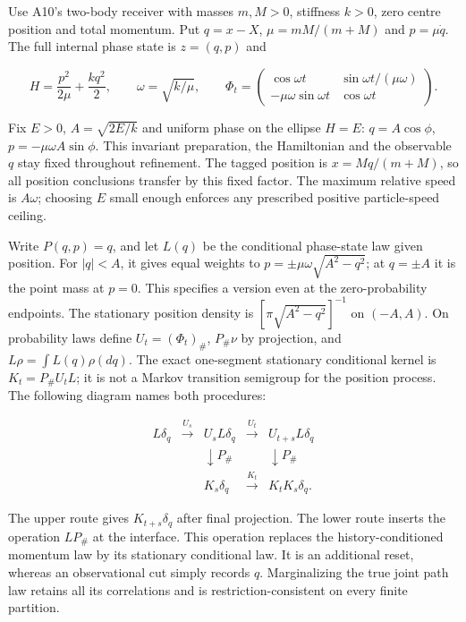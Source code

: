 \documentclass[11pt,a4paper]{article}
\begin{document}
Use A10's two-body receiver with masses \(m,M>0\), stiffness \(k>0\),
zero centre position and total momentum. Put \(q=x-X\), \(\mu=mM/(m+M)\)
and \(p=\mu\dot q\). The full internal phase state is \(z=(q,p)\) and

\[H=\frac{p^2}{2\mu}+\frac{kq^2}{2},\qquad
\omega=\sqrt{k/\mu},\qquad
\Phi_t=\begin{pmatrix}
\cos\omega t&\sin\omega t/(\mu\omega)\\
-\mu\omega\sin\omega t&\cos\omega t
\end{pmatrix}.
\]

Fix \(E>0\), \(A=\sqrt{2E/k}\) and uniform phase on the ellipse \(H=E\):
\(q=A\cos\phi\), \(p=-\mu\omega A\sin\phi\). This invariant preparation,
the Hamiltonian and the observable \(q\) stay fixed throughout
refinement. The tagged position is \(x=Mq/(m+M)\), so all position
conclusions transfer by this fixed factor. The maximum relative speed is
\(A\omega\); choosing \(E\) small enough enforces any prescribed
positive particle-speed ceiling.

Write \(P(q,p)=q\), and let \(L(q)\) be the conditional phase-state law
given position. For \(|q|<A\), it gives equal weights to
\(p=\pm\mu\omega\sqrt{A^2-q^2}\); at \(q=\pm A\) it is the point mass at
\(p=0\). This specifies a version even at the zero-probability
endpoints. The stationary position density is
\([\pi\sqrt{A^2-q^2}]^{-1}\) on \((-A,A)\). On probability laws define
\(U_t=(\Phi_t)_\#\), \(P_\#\nu\) by projection, and
\(L\rho=\int L(q)\rho(dq)\). The exact one-segment stationary
conditional kernel is \(K_t=P_\#U_tL\); it is not a Markov transition
semigroup for the position process. The following diagram names both
procedures:

\[
\begin{array}{ccccc}
L\delta_q&\xrightarrow{U_s}&U_sL\delta_q
 &\xrightarrow{U_t}&U_{t+s}L\delta_q\\
&&\downarrow P_\#&&\downarrow P_\#\\
&&K_s\delta_q&\xrightarrow{K_t}&K_tK_s\delta_q.
\end{array}
\]

The upper route gives \(K_{t+s}\delta_q\) after final projection. The
lower route inserts the operation \(LP_\#\) at the interface. This
operation replaces the history-conditioned momentum law by its
stationary conditional law. It is an additional reset, whereas an
observational cut simply records \(q\). Marginalizing the true joint
path law retains all its correlations and is restriction-consistent on
every finite partition.
\end{document}

